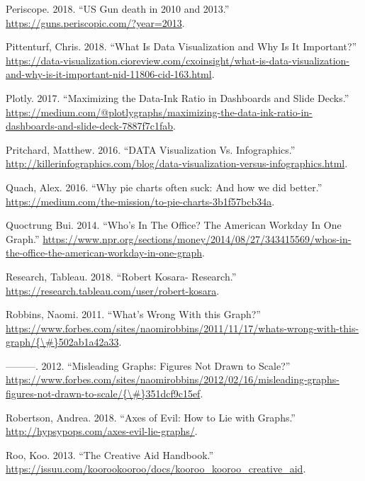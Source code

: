 \documentclass[]{book}
\begin{document}
\hypertarget{ref-narratives_2017}{}
Periscope. 2018. ``US Gun death in 2010 and 2013.''
\url{https://guns.periscopic.com/?year=2013}.

\hypertarget{ref-viz_importance}{}
Pittenturf, Chris. 2018. ``What Is Data Visualization and Why Is It
Important?''
\url{https://data-visualization.cioreview.com/cxoinsight/what-is-data-visualization-and-why-is-it-important-nid-11806-cid-163.html}.

\hypertarget{ref-appli_2017}{}
Plotly. 2017. ``Maximizing the Data-Ink Ratio in Dashboards and Slide
Decks.''
\url{https://medium.com/@plotlygraphs/maximizing-the-data-ink-ratio-in-dashboards-and-slide-deck-7887f7c1fab}.

\hypertarget{ref-VIZVSINFO}{}
Pritchard, Matthew. 2016. ``DATA Visualization Vs. Infographics.''
\url{http://killerinfographics.com/blog/data-visualization-versus-infographics.html}.

\hypertarget{ref-quach-penny}{}
Quach, Alex. 2016. ``Why pie charts often suck: And how we did better.''
\url{https://medium.com/the-mission/to-pie-charts-3b1f57bcb34a}.

\hypertarget{ref-NPR_workday}{}
Quoctrung Bui. 2014. ``Who's In The Office? The American Workday In One
Graph.''
\url{https://www.npr.org/sections/money/2014/08/27/343415569/whos-in-the-office-the-american-workday-in-one-graph}.

\hypertarget{ref-research_viz}{}
Research, Tableau. 2018. ``Robert Kosara- Research.''
\url{https://research.tableau.com/user/robert-kosara}.

\hypertarget{ref-whats_wrong}{}
Robbins, Naomi. 2011. ``What's Wrong With this Graph?''
\href{https://www.forbes.com/sites/naomirobbins/2011/11/17/whats-wrong-with-this-graph/\%7B/\#\%7D502ab1a42a33}{https://www.forbes.com/sites/naomirobbins/2011/11/17/whats-wrong-with-this-graph/\{\textbackslash{}\#\}502ab1a42a33}.

\hypertarget{ref-scaling_issues}{}
---------. 2012. ``Misleading Graphs: Figures Not Drawn to Scale?''
\href{https://www.forbes.com/sites/naomirobbins/2012/02/16/misleading-graphs-figures-not-drawn-to-scale/\%7B/\#\%7D351dcf9c15ef}{https://www.forbes.com/sites/naomirobbins/2012/02/16/misleading-graphs-figures-not-drawn-to-scale/\{\textbackslash{}\#\}351dcf9c15ef}.

\hypertarget{ref-evil_axes}{}
Robertson, Andrea. 2018. ``Axes of Evil: How to Lie with Graphs.''
\url{http://hypsypops.com/axes-evil-lie-graphs/}.

\hypertarget{ref-creative_aid_handbook}{}
Roo, Koo. 2013. ``The Creative Aid Handbook.''
\url{https://issuu.com/koorookooroo/docs/kooroo_kooroo_creative_aid}.
\end{document}
